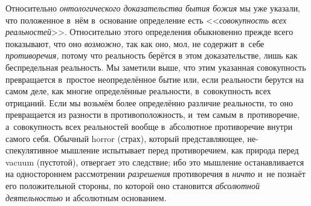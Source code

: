 Относительно {\em онтологического доказательства бытия
божия} мы уже указали, что положенное в~нём в~основание определение есть
<<{\em совокупность всех реальностей}>>. Относительно
этого определения обыкновенно прежде всего показывают, что оно
{\em возможно,} так как оно, мол, не содержит в~себе
{\em противоречия,} потому что реальность берётся в
этом доказательстве, лишь как беспредельная реальность. Мы заметили выше,
что этим указанная совокупность превращается в~простое неопределённое бытие
или, если реальности берутся на самом деле, как многие определённые
реальности, в~совокупность всех отрицаний. Если мы возьмём более
определённо различие реальности, то оно превращается из разности в
противоположность, и~тем самым в~противоречие, а~совокупность всех
реальностей вообще в~абсолютное противоречие внутри самого себя. Обычный
horror (страх), который представляющее, не-спекулятивное мышление
испытывает перед противоречием, как природа перед vacuum (пустотой),
отвергает это следствие; ибо это мышление останавливается на одностороннем
рассмотрении {\em разрешения} противоречия в
{\em ничто} и~не познаёт его положительной стороны, по
которой оно становится {\em абсолютной деятельностью} и
абсолютным основанием.

